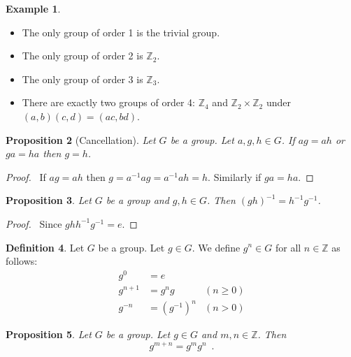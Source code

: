 \documentclass{book}
\let\qed\relax
\newtheorem{prop}{Proposition}[chapter]
\theoremstyle{definition}
\newtheorem{df}[prop]{Definition}
\newtheorem{ex}[prop]{Example}
\newcommand{\inv}[1]{\ensuremath{{#1}^{-1}}}
\begin{document}
\begin{ex}
    \begin{itemize}
        \item The only group of order 1 is the trivial group.
        \item The only group of order 2 is $\mathbb{Z}_2$.
        \item The only group of order 3 is $\mathbb{Z}_3$.
        \item There are exactly two groups of order 4: $\mathbb{Z}_4$ and $\mathbb{Z}_2
                  \times \mathbb{Z}_2$ under $(a,b) (c,d) = (ac,bd)$.
    \end{itemize}
\end{ex}

\begin{prop}[Cancellation]
    Let $G$ be a group. Let $a,g,h \in G$. If $ag = ah$ or $ga = ha$ then $g = h$.
\end{prop}

\begin{proof}
    \pf\ If $ag = ah$ then $g = \inv{a} a g = \inv{a} a h = h$. Similarly if $ga = ha$. \qed
\end{proof}

\begin{prop}
    Let $G$ be a group and $g,h \in G$. Then $(gh)^{-1} = h^{-1}g^{-1}$.
\end{prop}

\begin{proof}
    \pf\ Since $ghh^{-1}g^{-1} = e$. \qed
\end{proof}

\begin{df}
    Let $G$ be a group. Let $g \in G$. We define $g^n \in G$ for all $n \in \mathbb{Z}$ as follows:
    \begin{align*}
        g^0     & = e                       \\
        g^{n+1} & = g^n g      & (n \geq 0) \\
        g^{-n}  & = (g^{-1})^n & (n > 0)
    \end{align*}
\end{df}

\begin{prop}
    \label{prop:power-add}
    Let $G$ be a group. Let $g \in G$ and $m,n \in \mathbb{Z}$. Then
    \[ g^{m+n} = g^m g^n \enspace . \]
\end{prop}
\end{document}
